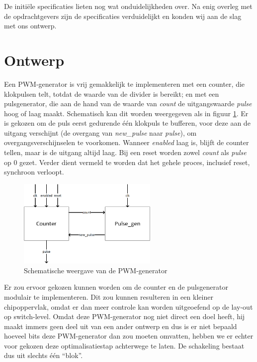 \documentclass{article}
\begin{document}
De initiële specificaties lieten nog wat onduidelijkheden over. Na enig overleg met de opdrachtgevers zijn de specificaties verduidelijkt en konden wij aan de slag met ons ontwerp.

\section{Ontwerp}
\label{sec:pwm-ontw}
Een PWM-generator is vrij gemakkelijk te implementeren met een counter, die klokpulsen telt, totdat de waarde van de divider is bereikt; en met een pulsgenerator, die aan de hand van de waarde van \textit{count} de uitgangswaarde \textit{pulse} hoog of laag maakt.
Schematisch kan dit worden weergegeven als in figuur \ref{fig:pwm-schem}. Er is gekozen om de puls eerst gedurende één klokpuls te bufferen, voor deze aan de uitgang verschijnt (de overgang van \textit{new\_pulse} naar \textit{pulse}), om overgangsverschijnselen te voorkomen. Wanneer \textit{enabled} laag is, blijft de counter tellen, maar is de uitgang altijd laag. Bij een reset worden zowel \textit{count} als \textit{pulse} op 0 gezet. Verder dient vermeld te worden dat het gehele proces, inclusief reset, synchroon verloopt.

\begin{figure}[H]
	\centering
	\includegraphics[width=0.6\textwidth]{resource/pwm_gen.png}
	\caption{Schematische weergave van de PWM-generator}
	\label{fig:pwm-schem}
\end{figure}

Er zou ervoor gekozen kunnen worden om de counter en de pulsgenerator modulair te implementeren. Dit zou kunnen resulteren in een kleiner chipoppervlak, omdat er dan meer controle kan worden uitgeoefend op de lay-out op switch-level. Omdat deze PWM-generator nog niet direct een doel heeft, hij maakt immers geen deel uit van een ander ontwerp en dus is er niet bepaald hoeveel bits deze PWM-generator dan zou moeten omvatten, hebben we er echter voor gekozen deze optimalisatiestap achterwege te laten. 
De schakeling bestaat dus uit slechts één ``blok''.
\end{document}
